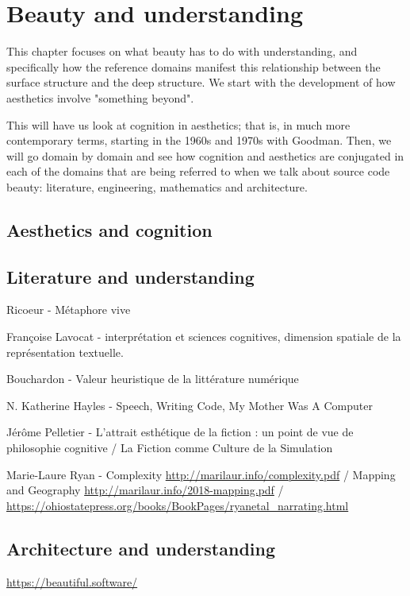 \chapter{Beauty and understanding}

This chapter focuses on what beauty has to do with understanding, and specifically how the reference domains manifest this relationship between the surface structure and the deep structure. We start with the development of how aesthetics involve "something beyond".

This will have us look at cognition in aesthetics; that is, in much more contemporary terms, starting in the 1960s and 1970s with Goodman. Then, we will go domain by domain and see how cognition and aesthetics are conjugated in each of the domains that are being referred to when we talk about source code beauty: literature, engineering, mathematics and architecture.

\section{Aesthetics and cognition}

\section{Literature and understanding}

Ricoeur - Métaphore vive

Françoise Lavocat - interprétation et sciences cognitives, dimension spatiale de la représentation textuelle.

Bouchardon - Valeur heuristique de la littérature numérique

N. Katherine Hayles - Speech, Writing Code, My Mother Was A Computer

Jérôme Pelletier -  L'attrait esthétique de la fiction : un point de vue de philosophie cognitive /  La Fiction comme Culture de la Simulation 

Marie-Laure Ryan - Complexity \url{http://marilaur.info/complexity.pdf} / Mapping and Geography \url{http://marilaur.info/2018-mapping.pdf} / \url{https://ohiostatepress.org/books/BookPages/ryanetal_narrating.html}

\section{Architecture and understanding}

\url{https://beautiful.software/}

